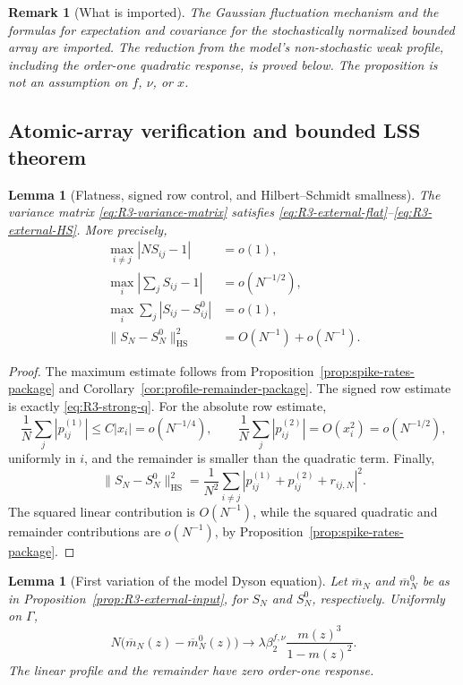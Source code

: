 \documentclass[10pt,a4paper]{amsart}
\newtheorem{lemma}[theorem]{Lemma}
\newtheorem{remark}[theorem]{Remark}
\newcommand{\HS}{\mathrm{HS}}
\newcommand{\norm}[1]{\lVert #1\rVert}
\begin{document}
\begin{remark}[What is imported]
The Gaussian fluctuation mechanism and the formulas for expectation and
covariance
for the stochastically normalized bounded array are imported.  The reduction
from the model's non-stochastic weak profile, including the order-one
quadratic response, is proved below.  The proposition is not an assumption on
\(f\), \(\nu\), or \(x\).
\end{remark}

\subsection{Atomic-array verification and bounded LSS theorem}

\begin{lemma}[Flatness, signed row control, and Hilbert--Schmidt smallness]
\label{lem:R3-flatness}
The variance matrix \eqref{eq:R3-variance-matrix} satisfies
\eqref{eq:R3-external-flat}--\eqref{eq:R3-external-HS}.  More precisely,
\begin{align}
 \max_{i\ne j}|NS_{ij}-1|&=o(1),\label{eq:R3-flat-a}\\
 \max_i\left|\sum_jS_{ij}-1\right|&=o(N^{-1/2}),
 \label{eq:R3-flat-strong-row}\\
 \max_i\sum_j|S_{ij}-S_{ij}^0|&=o(1),\label{eq:R3-flat-b}\\
 \norm{S_N-S_N^0}_{\HS}^2&=O(N^{-1})+o(N^{-1}).
 \label{eq:R3-flat-c}
\end{align}
\end{lemma}

\begin{proof}
The maximum estimate follows from
Proposition~\ref{prop:spike-rates-package} and
Corollary~\ref{cor:profile-remainder-package}.  The signed row estimate is
exactly \eqref{eq:R3-strong-q}.  For the absolute row estimate,
\[
 \frac1N\sum_j|p_{ij}^{(1)}|
 \le C|x_i|=o(N^{-1/4}),\qquad
 \frac1N\sum_j|p_{ij}^{(2)}|=O(x_i^2)=o(N^{-1/2}),
\]
uniformly in \(i\), and the remainder is smaller than the quadratic term.
Finally,
\[
 \norm{S_N-S_N^0}_{\HS}^2
 =\frac1{N^2}\sum_{i\ne j}
 |p_{ij}^{(1)}+p_{ij}^{(2)}+r_{ij,N}|^2.
\]
The squared linear contribution is \(O(N^{-1})\), while the squared
quadratic and remainder contributions are \(o(N^{-1})\), by
Proposition~\ref{prop:spike-rates-package}.
\end{proof}

\begin{lemma}[First variation of the model Dyson equation]
\label{lem:R3-Dyson-response}
Let \(\overline m_N\) and \(\overline m_N^0\) be as in
Proposition~\ref{prop:R3-external-input}, for \(S_N\) and \(S_N^0\),
respectively.  Uniformly on \(\Gamma\),
\begin{equation}\label{eq:R3-Dyson-limit}
 N\bigl(\overline m_N(z)-\overline m_N^0(z)\bigr)
 \longrightarrow
 \lambda\beta_2^{f,\nu}
 \frac{m(z)^3}{1-m(z)^2}.
\end{equation}
The linear profile and the remainder have zero order-one response.
\end{lemma}
\end{document}
